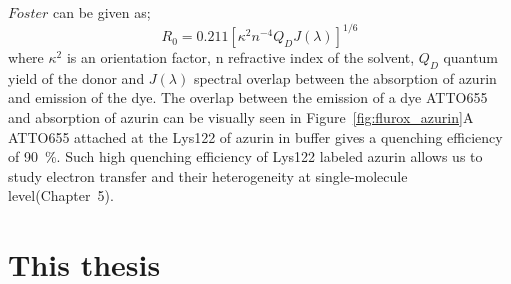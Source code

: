 \documentclass[11pt,a4paper,onecolumn]{article}
\begin{document}
$F\ddot{o}ster$ can be given as;
\begin{equation}
	R_0 = 0.211[\kappa^2n^{-4}Q_DJ(\lambda)]^{1/6}	
\end{equation}
where $\kappa^2$ is an orientation factor, n refractive index of the solvent, $Q_D$ quantum yield of the donor and $J(\lambda)$ spectral overlap between the absorption of azurin and emission of the dye.
The overlap between the emission of a dye ATTO655 and absorption of azurin can be visually seen in Figure~\ref{fig:flurox_azurin}A
ATTO655 attached at the Lys122 of azurin in buffer gives a quenching efficiency of \SI{90}{\percent}.
Such high quenching efficiency of Lys122 labeled azurin allows us to study electron transfer and their heterogeneity at single-molecule level(Chapter~5).

\section{This thesis}



\end{document}
